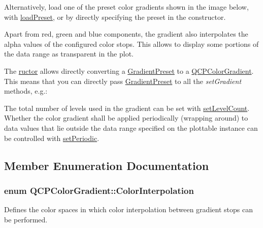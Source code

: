Alternatively, load one of the preset color gradients shown in the image below, with \hyperlink{class_q_c_p_color_gradient_aa0aeec1528241728b9671bf8e60b1622}{load\+Preset}, or by directly specifying the preset in the constructor.

Apart from red, green and blue components, the gradient also interpolates the alpha values of the configured color stops. This allows to display some portions of the data range as transparent in the plot.



The \hyperlink{class_q_c_p_color_gradient}{ructor} allows directly converting a \hyperlink{class_q_c_p_color_gradient_aed6569828fee337023670272910c9072}{Gradient\+Preset} to a \hyperlink{class_q_c_p_color_gradient}{Q\+C\+P\+Color\+Gradient}. This means that you can directly pass \hyperlink{class_q_c_p_color_gradient_aed6569828fee337023670272910c9072}{Gradient\+Preset} to all the {\itshape set\+Gradient} methods, e.\+g.\+: 
\begin{DoxyCodeInclude}
\end{DoxyCodeInclude}
 The total number of levels used in the gradient can be set with \hyperlink{class_q_c_p_color_gradient_a18da587eb4f7fc788ea28ba15b6a12de}{set\+Level\+Count}. Whether the color gradient shall be applied periodically (wrapping around) to data values that lie outside the data range specified on the plottable instance can be controlled with \hyperlink{class_q_c_p_color_gradient_a39d6448155fc00a219f239220d14bb39}{set\+Periodic}. 

\subsection{Member Enumeration Documentation}
\subsubsection[{\texorpdfstring{Color\+Interpolation}{ColorInterpolation}}]{\setlength{\rightskip}{0pt plus 5cm}enum {\bf Q\+C\+P\+Color\+Gradient\+::\+Color\+Interpolation}}\hypertarget{class_q_c_p_color_gradient_ac5dca17cc24336e6ca176610e7f77fc1}{}\label{class_q_c_p_color_gradient_ac5dca17cc24336e6ca176610e7f77fc1}
Defines the color spaces in which color interpolation between gradient stops can be performed.

